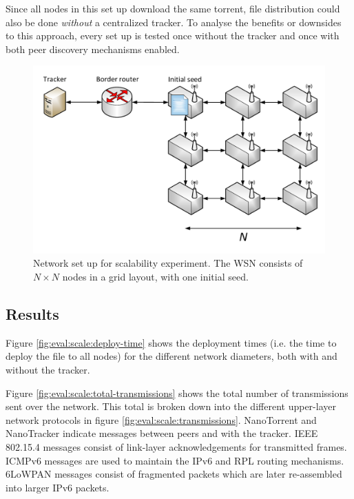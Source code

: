 Since all nodes in this set up download the same torrent, file distribution could also be done \emph{without} a centralized tracker. To analyse the benefits or downsides to this approach, every set up is tested once without the tracker and once with both peer discovery mechanisms enabled.

\begin{figure}
    \centering
    \includegraphics[width=\textwidth]{diagrams/experiment-scale.pdf}
    \caption[Network set up for scalability experiment]{Network set up for scalability experiment. The \gls{WSN} consists of $N \times N$ nodes in a grid layout, with one initial seed.}
    \label{fig:eval:scale:setup}
\end{figure}

\subsection{Results}
Figure \ref{fig:eval:scale:deploy-time} shows the deployment times (i.e. the time to deploy the file to all nodes) for the different network diameters, both with and without the tracker.

Figure \ref{fig:eval:scale:total-transmissions} shows the total number of transmissions sent over the network. This total is broken down into the different upper-layer network protocols in figure \ref{fig:eval:scale:transmissions}. NanoTorrent and NanoTracker indicate messages between peers and with the tracker. \gls{IEEE} 802.15.4 messages consist of link-layer acknowledgements for transmitted frames. \gls{ICMPv6} messages are used to maintain the \gls{IPv6} and \gls{RPL} routing mechanisms. \gls{6LoWPAN} messages consist of fragmented packets which are later re-assembled into larger \gls{IPv6} packets.

